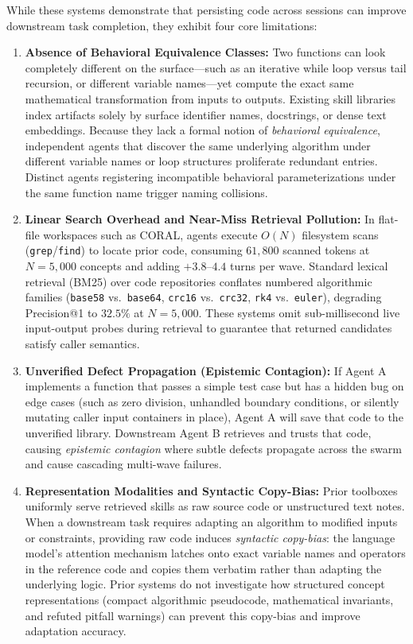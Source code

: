 \documentclass[10pt,twocolumn]{article}
\begin{document}
While these systems demonstrate that persisting code across sessions can improve downstream task completion, they exhibit four core limitations:
\begin{enumerate}
    \item \textbf{Absence of Behavioral Equivalence Classes:} Two functions can look completely different on the surface---such as an iterative while loop versus tail recursion, or different variable names---yet compute the exact same mathematical transformation from inputs to outputs. Existing skill libraries index artifacts solely by surface identifier names, docstrings, or dense text embeddings. Because they lack a formal notion of \emph{behavioral equivalence}, independent agents that discover the same underlying algorithm under different variable names or loop structures proliferate redundant entries. Distinct agents registering incompatible behavioral parameterizations under the same function name trigger naming collisions.
    \item \textbf{Linear Search Overhead and Near-Miss Retrieval Pollution:} In flat-file workspaces such as \textsc{CORAL}, agents execute $O(N)$ filesystem scans (\texttt{grep}/\texttt{find}) to locate prior code, consuming $61{,}800$ scanned tokens at $N=5{,}000$ concepts and adding $+3.8\text{--}4.4$ turns per wave. Standard lexical retrieval (BM25) over code repositories conflates numbered algorithmic families (\texttt{base58} vs.\ \texttt{base64}, \texttt{crc16} vs.\ \texttt{crc32}, \texttt{rk4} vs.\ \texttt{euler}), degrading Precision@1 to $32.5\%$ at $N=5{,}000$. These systems omit sub-millisecond live input-output probes during retrieval to guarantee that returned candidates satisfy caller semantics.
    \item \textbf{Unverified Defect Propagation (Epistemic Contagion):} If Agent A implements a function that passes a simple test case but has a hidden bug on edge cases (such as zero division, unhandled boundary conditions, or silently mutating caller input containers in place), Agent A will save that code to the unverified library. Downstream Agent B retrieves and trusts that code, causing \emph{epistemic contagion} where subtle defects propagate across the swarm and cause cascading multi-wave failures.
    \item \textbf{Representation Modalities and Syntactic Copy-Bias:} Prior toolboxes uniformly serve retrieved skills as raw source code or unstructured text notes. When a downstream task requires adapting an algorithm to modified inputs or constraints, providing raw code induces \emph{syntactic copy-bias}: the language model's attention mechanism latches onto exact variable names and operators in the reference code and copies them verbatim rather than adapting the underlying logic. Prior systems do not investigate how structured concept representations (compact algorithmic pseudocode, mathematical invariants, and refuted pitfall warnings) can prevent this copy-bias and improve adaptation accuracy.
\end{enumerate}
\end{document}
